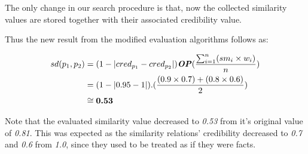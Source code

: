 The only change in our search procedure is that, now the collected similarity values are stored together with their associated credibility value.

Thus the new result from the modified evaluation algorithms follows as:

\begin{equation}\label{eq:sdE5}
\begin{split}
\textit{$sd(p_{1}, p_{2})$} &=   (1-\lvert  \textit{$cred_{p_{1}}$} - \textit{$cred_{p_{2}}$}  \rvert) \textbf{\emph{OP}} (\frac{\sum_{i=1}^{n} (sm_i \times w_i)}{n})\\
 &=   (1-\lvert  0.95 - 1  \rvert) . (\frac{(0.9\times 0.7) + (0.8 \times 0.6)}{2}) \\
&\cong{\textbf{0.53}}
 \end{split} 
\end{equation}

Note that the evaluated similarity value decreased to \textit{0.53} from it's original value of \textit{0.81}. This was expected as the similarity  relations' credibility decreased to \textit{0.7} and \textit{0.6} from \textit{1.0}, since they used to be treated as if they were facts. 